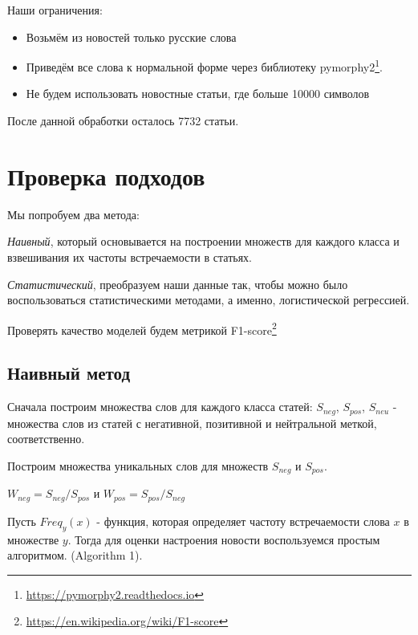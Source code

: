 \documentclass[12pt]{article}
\begin{document}
        Наши ограничения:
        \begin{itemize}
            \item Возьмём из новостей только русские слова
            \item Приведём все слова к нормальной форме через библиотеку pymorphy2\footnote{\href{https://pymorphy2.readthedocs.io}{https://pymorphy2.readthedocs.io}}.
            \item Не будем использовать новостные статьи, где больше 10000 символов
        \end{itemize}

        После данной обработки осталось 7732 статьи.

    \section{Проверка подходов}
        Мы попробуем два метода: 
        
        \textit{Наивный}, который основывается на построении множеств для каждого класса и взвешивания их 
        частоты встречаемости в статьях. 
        
        \textit{Статистический}, преобразуем наши данные так, чтобы можно было 
        воспользоваться статистическими методами, а именно, логистической регрессией.

        Проверять качество моделей будем метрикой F1-score\footnote{\href{https://en.wikipedia.org/wiki/F1\_score}{https://en.wikipedia.org/wiki/F1-score}}

        \subsection{Наивный метод}
            Сначала построим множества слов для каждого класса статей: $S_{neg}$,
            $S_{pos}$, $S_{neu}$ - множества слов из статей с негативной, 
            позитивной и нейтральной меткой, соответственно.

            Построим множества уникальных слов для множеств $S_{neg}$ и $S_{pos}$.
            \begin{center}
                $W_{neg} = S_{neg} / S_{pos}$ и $W_{pos} = S_{pos} / S_{neg}$
            \end{center}

            Пусть $Freq_y(x)$ - функция, которая определяет частоту встречаемости слова $x$
            в множестве $y$. Тогда для оценки настроения новости воспользуемся простым алгоритмом.
            (Algorithm 1). 
            
\end{document}
